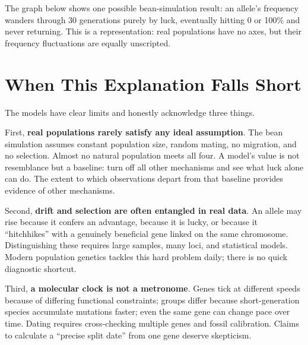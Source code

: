 The graph below shows one possible bean-simulation result: an allele's frequency wanders through 30 generations purely by luck, eventually hitting 0 or 100\% and never returning. This is a representation: real populations have no axes, but their frequency fluctuations are equally unscripted.

\begin{center}
\end{center}

\section{When This Explanation Falls Short}

The models have clear limits and honestly acknowledge three things.

First, \textbf{real populations rarely satisfy any ideal assumption}. The bean simulation assumes constant population size, random mating, no migration, and no selection. Almost no natural population meets all four. A model's value is not resemblance but a baseline: turn off all other mechanisms and see what luck alone can do. The extent to which observations depart from that baseline provides evidence of other mechanisms.

Second, \textbf{drift and selection are often entangled in real data}. An allele may rise because it confers an advantage, because it is lucky, or because it ``hitchhikes'' with a genuinely beneficial gene linked on the same chromosome. Distinguishing these requires large samples, many loci, and statistical models. Modern population genetics tackles this hard problem daily; there is no quick diagnostic shortcut.

Third, \textbf{a molecular clock is not a metronome}. Genes tick at different speeds because of differing functional constraints; groups differ because short-generation species accumulate mutations faster; even the same gene can change pace over time. Dating requires cross-checking multiple genes and fossil calibration. Claims to calculate a ``precise split date'' from one gene deserve skepticism.


